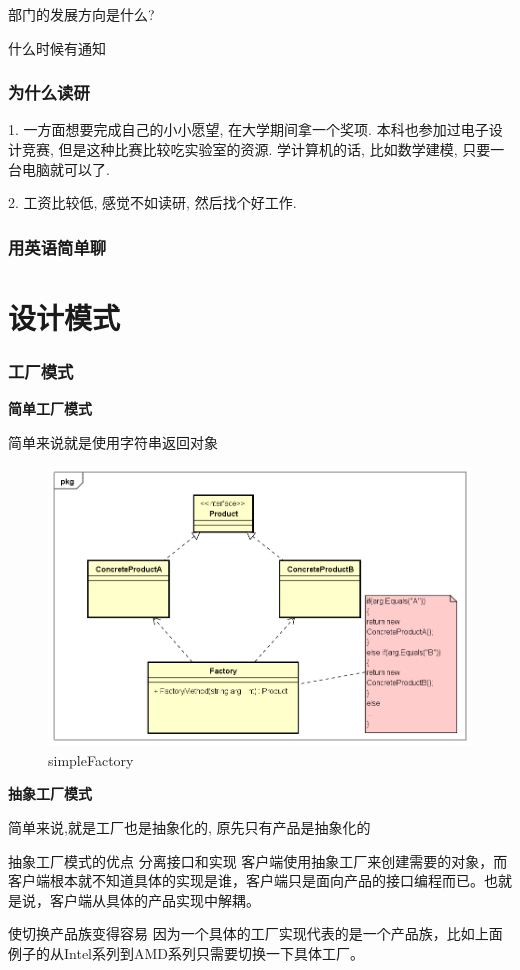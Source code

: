 \documentclass[UTF8]{ctexart}
\begin{document}
部门的发展方向是什么?

什么时候有通知


\subsubsection{为什么读研}
1. 一方面想要完成自己的小小愿望, 在大学期间拿一个奖项. 本科也参加过电子设计竞赛, 但是这种比赛比较吃实验室的资源. 学计算机的话, 比如数学建模, 只要一台电脑就可以了.

2. 工资比较低, 感觉不如读研, 然后找个好工作.

\subsubsection{用英语简单聊}


\section{设计模式}
\subsubsection{工厂模式}
\textbf{简单工厂模式}

简单来说就是使用字符串返回对象
\begin{figure}
	\centering
	\includegraphics[width=0.7\linewidth]{figures/simpleFactory.png}
	\caption{simpleFactory}
	\label{fig:simpleFactory}
\end{figure}

\textbf{抽象工厂模式}

简单来说,就是工厂也是抽象化的, 原先只有产品是抽象化的

抽象工厂模式的优点
分离接口和实现
客户端使用抽象工厂来创建需要的对象，而客户端根本就不知道具体的实现是谁，客户端只是面向产品的接口编程而已。也就是说，客户端从具体的产品实现中解耦。

使切换产品族变得容易
因为一个具体的工厂实现代表的是一个产品族，比如上面例子的从Intel系列到AMD系列只需要切换一下具体工厂。
\end{document}
